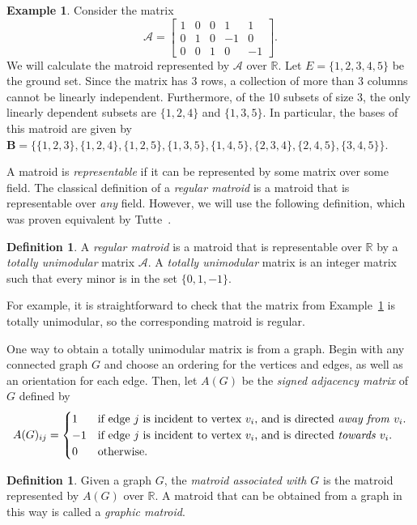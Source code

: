 \documentclass[12p]{amsart}
\numberwithin{equation}{section}
\theoremstyle{plain}
\theoremstyle{definition}
\newtheorem{defn}[thm]{Definition}
\newtheorem{ex}[thm]{Example}
\begin{document}
\begin{ex}\label{ex:kylematroid}
    Consider the matrix \[\mathcal A = \begin{bmatrix} 1 & 0 & 0 & 1 & 1\\
    0 & 1 & 0 & -1 & 0 \\
    0 & 0 & 1 & 0 & -1 \end{bmatrix}.\]
    We will calculate the matroid represented by $\mathcal A$ over $\mathbb R$. Let $E = \{1,2,3,4,5\}$ be the ground set. Since the matrix has 3 rows, a collection of more than 3 columns cannot be linearly independent. Furthermore, of the 10 subsets of size 3, the only linearly dependent subsets are $\{1,2,4\}$ and $\{1,3,5\}$. In particular, the bases of this matroid are given by $\mathbf B = \{\{1,2,3\},\{1,2,4\},\{1,2,5\},\{1,3,5\},\{1,4,5\},\{2,3,4\},\{2,4,5\},\{3,4,5\}\}$. 
\end{ex}

A matroid is \emph{representable} if it can be represented by some matrix over some field. The classical definition of a \emph{regular matroid} is a matroid that is representable over \emph{any} field. However, we will use the following definition, which was proven equivalent by Tutte~\cite{Tutte}. 
\begin{defn}
    A \emph{regular matroid} is a matroid that is representable over $\mathbb R$ by a \emph{totally unimodular} matrix $\mathcal A$. A \emph{totally unimodular} matrix is an integer matrix such that every minor is in the set $\{0, 1,-1\}$. 
\end{defn}

For example, it is straightforward to check that the matrix from Example~\ref{ex:kylematroid} is totally unimodular, so the corresponding matroid is regular. 

One way to obtain a totally unimodular matrix is from a graph. Begin with any connected graph $G$ and choose an ordering for the vertices and edges, as well as an orientation for each edge. Then, let $A(G)$ be the \emph{signed adjacency matrix} of $G$ defined by
\[A(G)_{ij} = \begin{cases} 1 & \text{if edge $j$ is incident to vertex $v_i$, and is directed \textit{away from} $v_i$.}\\
-1 & \text{if edge $j$ is incident to vertex $v_i$, and is directed \textit{towards} $v_i$.}\\
0 & \text{otherwise.}\end{cases}\]

\begin{defn}
    Given a graph $G$, the \emph{matroid associated with $G$} is the matroid represented by $A(G)$ over $\mathbb R$. A matroid that can be obtained from a graph in this way is called a \emph{graphic matroid}.
\end{defn}
\end{document}
